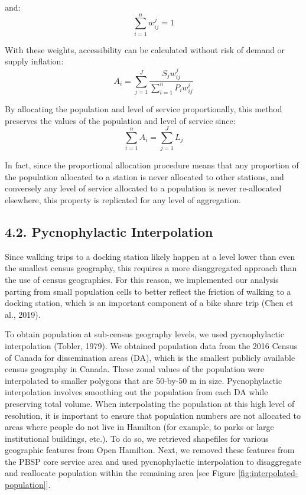 \documentclass[]{elsarticle} %
\begin{document}
\noindent and: \begin{equation}
\label{eq:weights-2}
\sum_{i = 1}^{n} {w^j_{ij}} = 1
\end{equation}

With these weights, accessibility can be calculated without risk of
demand or supply inflation: \begin{equation}
\label{eq:balanced-accessibility}
A_i = {\sum_{j = 1}^{J} \frac {S_j{w^j_{ij}}}{\sum_{i = 1}^{n} P_i{w^i_{ij}}}}
\end{equation}

By allocating the population and level of service proportionally, this
method preserves the values of the population and level of service
since: \begin{equation}
\label{eq:proportionality}
\sum_{i=1}^n A_i = \sum_{j=1}^J L_j
\end{equation}

In fact, since the proportional allocation procedure means that any
proportion of the population allocated to a station is never allocated
to other stations, and conversely any level of service allocated to a
population is never re-allocated elsewhere, this property is replicated
for any level of aggregation.

\hypertarget{pycnophylactic-interpolation}{%
\subsection{4.2. Pycnophylactic
Interpolation}\label{pycnophylactic-interpolation}}

Since walking trips to a docking station likely happen at a level lower
than even the smallest census geography, this requires a more
disaggregated approach than the use of census geographies. For this
reason, we implemented our analysis parting from small population cells
to better reflect the friction of walking to a docking station, which is
an important component of a bike share trip (Chen et al., 2019).

To obtain population at sub-census geography levels, we used
pycnophylactic interpolation (Tobler, 1979). We obtained population data
from the 2016 Census of Canada for dissemination areas (DA), which is
the smallest publicly available census geography in Canada. These zonal
values of the population were interpolated to smaller polygons that are
50-by-50 m in size. Pycnophylactic interpolation involves smoothing out
the population from each DA while preserving total volume. When
interpolating the population at this high level of resolution, it is
important to ensure that population numbers are not allocated to areas
where people do not live in Hamilton (for example, to parks or large
institutional buildings, etc.). To do so, we retrieved shapefiles for
various geographic features from Open Hamilton. Next, we removed these
features from the PBSP core service area and used pycnophylactic
interpolation to disaggregate and reallocate population within the
remaining area {[}see Figure \ref{fig:interpolated-population}{]}.
\end{document}
